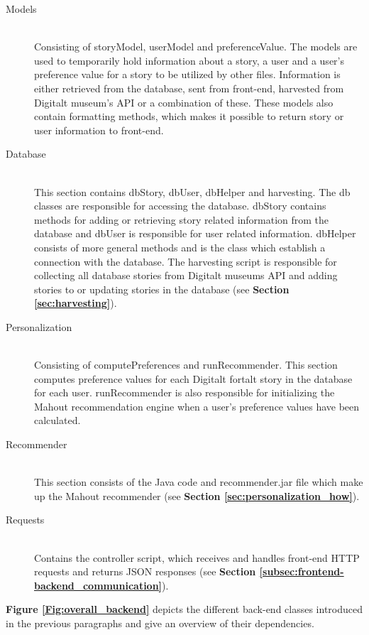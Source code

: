 \begin{description}
	\item[Models] \hfill \\
	Consisting of storyModel, userModel and preferenceValue. The models are used to temporarily hold information about a story, a user and a user's preference value for a story to be utilized by other files. Information is either retrieved from the database, sent from front-end, harvested from Digitalt museum's API or a combination of these. These models also contain formatting methods, which makes it possible to return story or user information to front-end.
	
	\item[Database] \hfill \\
	This section contains dbStory, dbUser, dbHelper and harvesting. The db classes are responsible for accessing the database. dbStory contains methods for adding or retrieving story related information from the database and dbUser is responsible for user related information. dbHelper consists of more general methods and is the class which establish a connection with the database. The harvesting script is responsible for collecting all database stories from Digitalt museums API and adding stories to or updating stories in the database (see \textbf{Section \ref{sec:harvesting}}).
	
	\item[Personalization] \hfill \\
	Consisting of computePreferences and runRecommender. This section computes preference values for each Digitalt fortalt story in the database for each user. runRecommender is also responsible for initializing the Mahout recommendation engine when a user's preference values have been calculated.
	
	\item[Recommender] \hfill \\
	This section consists of the Java code and recommender.jar file which make up the Mahout recommender (see \textbf{Section \ref{sec:personalization_how}}).
	
	\item[Requests] \hfill \\
	Contains the controller script, which receives and handles front-end HTTP requests and returns JSON responses (see \textbf{Section \ref{subsec:frontend-backend_communication}}).
	
\end{description}

\textbf{Figure \ref{Fig:overall_backend}} depicts the different back-end classes introduced in the previous paragraphs and give an overview of their dependencies.

